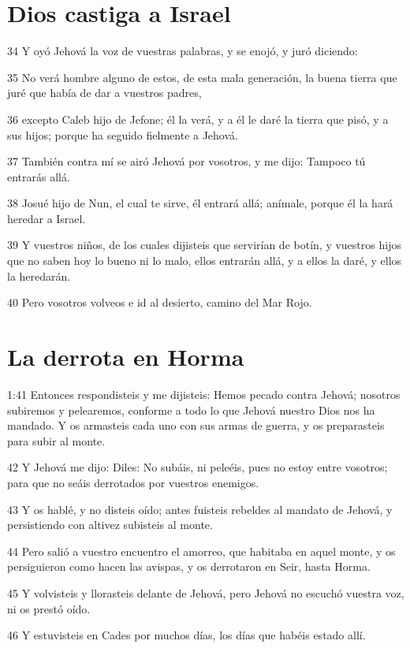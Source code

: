 \section{Dios castiga a Israel }

\par 34 Y oyó Jehová la voz de vuestras palabras, y se enojó, y juró diciendo:
\par 35 No verá hombre alguno de estos, de esta mala generación, la buena tierra que juré que había de dar a vuestros padres,
\par 36 excepto Caleb hijo de Jefone; él la verá, y a él le daré la tierra que pisó, y a sus hijos; porque ha seguido fielmente a Jehová.
\par 37 También contra mí se airó Jehová por vosotros, y me dijo: Tampoco tú entrarás allá.
\par 38 Josué hijo de Nun, el cual te sirve, él entrará allá; anímale, porque él la hará heredar a Israel.
\par 39 Y vuestros niños, de los cuales dijisteis que servirían de botín, y vuestros hijos que no saben hoy lo bueno ni lo malo, ellos entrarán allá, y a ellos la daré, y ellos la heredarán.
\par 40 Pero vosotros volveos e id al desierto, camino del Mar Rojo.

\section{La derrota en Horma }

\par 1:41 Entonces respondisteis y me dijisteis: Hemos pecado contra Jehová; nosotros subiremos y pelearemos, conforme a todo lo que Jehová nuestro Dios nos ha mandado. Y os armasteis cada uno con sus armas de guerra, y os preparasteis para subir al monte.
\par 42 Y Jehová me dijo: Diles: No subáis, ni peleéis, pues no estoy entre vosotros; para que no seáis derrotados por vuestros enemigos.
\par 43 Y os hablé, y no disteis oído; antes fuisteis rebeldes al mandato de Jehová, y persistiendo con altivez subisteis al monte.
\par 44 Pero salió a vuestro encuentro el amorreo, que habitaba en aquel monte, y os persiguieron como hacen las avispas, y os derrotaron en Seir, hasta Horma.
\par 45 Y volvisteis y llorasteis delante de Jehová, pero Jehová no escuchó vuestra voz, ni os prestó oído.
\par 46 Y estuvisteis en Cades por muchos días, los días que habéis estado allí.

